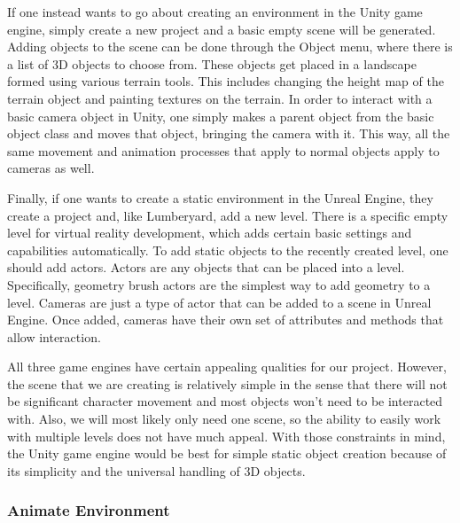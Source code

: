 \documentclass[10pt,journal,compsoc,onecolumn, draftclsnofoot]{IEEEtran}
\begin{document}
If one instead wants to go about creating an environment in the Unity game engine, simply create a new project and a basic empty scene will be generated.
Adding objects to the scene can be done through the Object menu, where there is a list of 3D objects to choose from. \cite{unity_getting_started}
These objects get placed in a landscape formed using various terrain tools.
This includes changing the height map of the terrain object and painting textures on the terrain.
In order to interact with a basic camera object in Unity, one simply makes a parent object from the basic object class and moves that object, bringing the camera with it.
This way, all the same movement and animation processes that apply to normal objects apply to cameras as well. \cite{unity_getting_started}

Finally, if one wants to create a static environment in the Unreal Engine, they create a project and, like Lumberyard, add a new level.
There is a specific empty level for virtual reality development, which adds certain basic settings and capabilities automatically. \cite{unreal_editor_manual}
To add static objects to the recently created level, one should add actors.  Actors are any objects that can be placed into a level.
Specifically, geometry brush actors are the simplest way to add geometry to a level. \cite{unreal_editor_manual}
Cameras are just a type of actor that can be added to a scene in Unreal Engine.  Once added, cameras have their own set of attributes and methods that allow interaction.

All three game engines have certain appealing qualities for our project.
However, the scene that we are creating is relatively simple in the sense that there will not be significant character movement and most objects won't need to be interacted with.
Also, we will most likely only need one scene, so the ability to easily work with multiple levels does not have much appeal.
With those constraints in mind, the Unity game engine would be best for simple static object creation because of its simplicity and the universal handling of 3D objects.

\subsubsection{Animate Environment}
\end{document}
